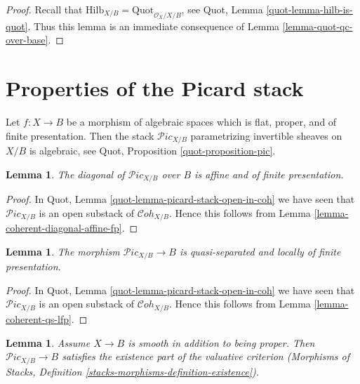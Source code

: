 \documentclass{stacks-project}
\theoremstyle{plain}
\newtheorem{lemma}[subsection]{Lemma}
\theoremstyle{definition}
\theoremstyle{remark}
\numberwithin{equation}{subsection}
\def\Cohstack{\mathcal{C}\!\mathit{oh}}
\def\Quotfunctor{\mathrm{Quot}}
\def\Hilbfunctor{\mathrm{Hilb}}
\def\Picardstack{\mathcal{P}\!\mathit{ic}}
\begin{document}
\begin{proof}
Recall that $\Hilbfunctor_{X/B} = \Quotfunctor_{\mathcal{O}_X/X/B}$, see
Quot, Lemma \ref{quot-lemma-hilb-is-quot}.
Thus this lemma is an immediate consequence of
Lemma \ref{lemma-quot-qc-over-base}.
\end{proof}









\section{Properties of the Picard stack}
\label{section-picard-stack}

\noindent
Let $f : X \to B$ be a morphism of algebraic spaces which is flat,
proper, and of finite presentation. Then the stack
$\Picardstack_{X/B}$ parametrizing invertible sheaves on $X/B$
is algebraic, see Quot, Proposition \ref{quot-proposition-pic}.

\begin{lemma}
\label{lemma-pic-diagonal-affine-fp}
The diagonal of $\Picardstack_{X/B}$ over $B$ is affine
and of finite presentation.
\end{lemma}

\begin{proof}
In Quot, Lemma \ref{quot-lemma-picard-stack-open-in-coh} we have seen that
$\Picardstack_{X/B}$ is an open substack of
$\Cohstack_{X/B}$. Hence this follows from
Lemma \ref{lemma-coherent-diagonal-affine-fp}.
\end{proof}

\begin{lemma}
\label{lemma-pic-qs-lfp}
The morphism $\Picardstack_{X/B} \to B$ is quasi-separated and
locally of finite presentation.
\end{lemma}

\begin{proof}
In Quot, Lemma \ref{quot-lemma-picard-stack-open-in-coh} we have seen that
$\Picardstack_{X/B}$ is an open substack of
$\Cohstack_{X/B}$. Hence this follows from
Lemma \ref{lemma-coherent-qs-lfp}.
\end{proof}

\begin{lemma}
\label{lemma-pic-existence-part}
Assume $X \to B$ is smooth in addition to being proper.
Then $\Picardstack_{X/B} \to B$ satisfies the existence part
of the valuative criterion (Morphisms of Stacks, Definition
\ref{stacks-morphisms-definition-existence}).
\end{lemma}
\end{document}
